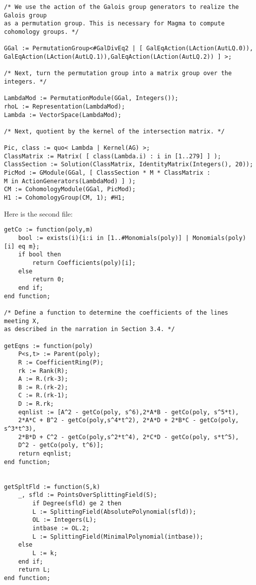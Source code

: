 \documentclass[12pt,twoside]{reedthesis}
\theoremstyle{plain}
\theoremstyle{definition}
\theoremstyle{remark}
\begin{document}
\begin{appendices}
\begin{verbatim}
/* We use the action of the Galois group generators to realize the Galois group 
as a permutation group. This is necessary for Magma to compute cohomology groups. */

GGal := PermutationGroup<#GalDivEq2 | [ GalEqAction(LAction(AutLQ.0)), 
GalEqAction(LAction(AutLQ.1)),GalEqAction(LAction(AutLQ.2)) ] >;

/* Next, turn the permutation group into a matrix group over the integers. */

LambdaMod := PermutationModule(GGal, Integers());
rhoL := Representation(LambdaMod);
Lambda := VectorSpace(LambdaMod); 

/* Next, quotient by the kernel of the intersection matrix. */

Pic, class := quo< Lambda | Kernel(AG) >; 
ClassMatrix := Matrix( [ class(Lambda.i) : i in [1..279] ] );
ClassSection := Solution(ClassMatrix, IdentityMatrix(Integers(), 20));
PicMod := GModule(GGal, [ ClassSection * M * ClassMatrix : 
M in ActionGenerators(LambdaMod) ] );
CM := CohomologyModule(GGal, PicMod);
H1 := CohomologyGroup(CM, 1); #H1;

\end{verbatim}

\noindent Here is the second file:
\begin{verbatim}
getCo := function(poly,m)
	bool := exists(i){i:i in [1..#Monomials(poly)] | Monomials(poly)[i] eq m};
	if bool then
		return Coefficients(poly)[i];
	else
		return 0;
	end if;
end function;

/* Define a function to determine the coefficients of the lines meeting X, 
as described in the narration in Section 3.4. */

getEqns := function(poly)
	P<s,t> := Parent(poly);
	R := CoefficientRing(P);
	rk := Rank(R);
	A := R.(rk-3);
	B := R.(rk-2);
	C := R.(rk-1);
	D := R.rk;
	eqnlist := [A^2 - getCo(poly, s^6),2*A*B - getCo(poly, s^5*t), 
	2*A*C + B^2 - getCo(poly,s^4*t^2), 2*A*D + 2*B*C - getCo(poly, s^3*t^3), 
	2*B*D + C^2 - getCo(poly,s^2*t^4), 2*C*D - getCo(poly, s*t^5), 
	D^2 - getCo(poly, t^6)];
	return eqnlist;
end function;


getSpltFld := function(S,k)
	_, sfld := PointsOverSplittingField(S);
		if Degree(sfld) ge 2 then
		L := SplittingField(AbsolutePolynomial(sfld));
		OL := Integers(L);
		intbase := OL.2;
		L := SplittingField(MinimalPolynomial(intbase));
	else
		L := k;
	end if;
	return L;
end function;



\end{verbatim}
\end{appendices}
\end{document}
